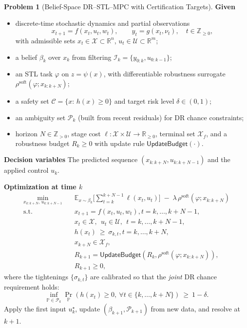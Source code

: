 \documentclass[journal]{IEEEtran}
\theoremstyle{definition}
\newtheorem{problem}{Problem}
\begin{document}
\begin{problem}[Belief-Space DR--STL--MPC with Certification Targets]
\label{prob:dr-stl-mpc-single}
\textbf{Given}
\begin{itemize}
  \item discrete-time stochastic dynamics and partial observations
  \[
  x_{t+1}=f(x_t,u_t,w_t),\qquad y_t=g(x_t,\nu_t),\quad t\in\mathbb{Z}_{\ge 0},
  \]
  with admissible sets $x_t\in\mathcal{X}\subset\mathbb{R}^n$, $u_t\in\mathcal{U}\subset\mathbb{R}^m$;
  \item a belief $\beta_k$ over $x_k$ from filtering $\mathcal{I}_k=\{y_{0:k},u_{0:k-1}\}$;
  \item an STL task $\varphi$ on $z=\psi(x)$, with differentiable robustness surrogate $\rho^{\mathrm{soft}}(\varphi;x_{k:k+N})$;
  \item a safety set $\mathcal{C}=\{x:\,h(x)\ge 0\}$ and target risk level $\delta\in(0,1)$;
  \item an ambiguity set $\mathcal{P}_k$ (built from recent residuals) for DR chance constraints;
  \item horizon $N\in\mathbb{Z}_{>0}$, stage cost $\ell:\mathcal{X}\times\mathcal{U}\!\to\!\mathbb{R}_{\ge 0}$,
        terminal set $\mathcal{X}_f$, and a robustness budget $R_k\ge 0$ with update rule $\mathsf{UpdateBudget}(\cdot)$.
\end{itemize}

\textbf{Decision variables}
The predicted sequence $(x_{k:k+N},u_{k:k+N-1})$ and the applied control $u_k$.

\textbf{Optimization at time $k$}
\begin{equation*}
\begin{aligned}
\min_{x_{k:k+N},\,u_{k:k+N-1}}\quad
& \mathbb{E}_{x\sim\beta_k}\!\Big[\sum_{t=k}^{k+N-1}\ell(x_t,u_t)\Big]
\;-\;\lambda\,\rho^{\mathrm{soft}}(\varphi;x_{k:k+N})\\[2mm]
\text{s.t.} 
& x_{t+1}=f(x_t,u_t,w_t), t=k,\dots,k+N-1,\\
& x_t\in\mathcal{X},\ \ u_t\in\mathcal{U},   \ \ t=k,\dots,k+N-1,\\
& h(x_t)\ \ge\ \sigma_{k,t},    t=k,\dots,k+N,\\
& x_{k+N}\in\mathcal{X}_f, \\
& R_{k+1}=\mathsf{UpdateBudget}\!\left(R_k,\rho^{\mathrm{soft}}(\varphi;x_{k:k+N})\right),\\ 
&R_{k+1}\ge 0,
\end{aligned}
\end{equation*}
where the tightenings $\{\sigma_{k,t}\}$ are calibrated so that the \emph{joint} DR chance requirement holds:
\[
\inf_{\mathbb{P}\in\mathcal{P}_k}
\Pr_{\mathbb{P}}\!\left(h(x_t)\ge 0,\ \forall t\in\{k,\dots,k+N\}\right)\ \ge\ 1-\delta.
\]
Apply the first input $u_k^\star$, update $(\beta_{k+1},\mathcal{P}_{k+1})$ from new data, and resolve at $k{+}1$.


\end{problem}
\end{document}
